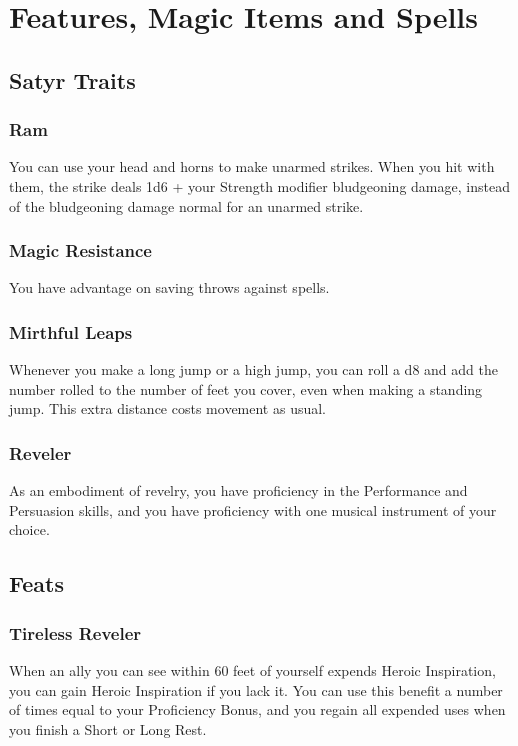 \documentclass[letterpaper,openany,oneside,twocolumn]{book}
\begin{document}
\onecolumn


\rendercharactersheet

\renderbackgroundsheet

\renderspellsheet


\restoregeometry
\twocolumn

\chapter*{Features, Magic Items and Spells}

\section*{Satyr Traits}
\subsection*{Ram}
You can use your head and horns to make unarmed strikes. When you hit with them, the strike deals 1d6 + your Strength modifier bludgeoning damage, instead of the bludgeoning damage normal for an unarmed strike.
\subsection*{Magic Resistance}
You have advantage on saving throws against spells.
\subsection*{Mirthful Leaps}
Whenever you make a long jump or a high jump, you can roll a d8 and add the number rolled to the number of feet you cover, even when making a standing jump. This extra distance costs movement as usual.
\subsection*{Reveler}
As an embodiment of revelry, you have proficiency in the Performance and Persuasion skills, and you have proficiency with one musical instrument of your choice.

\section*{Feats}
\subsection*{Tireless Reveler}
When an ally you can see within 60 feet of yourself expends Heroic Inspiration, you can gain Heroic Inspiration if you lack it. You can use this benefit a number of times equal to your Proficiency Bonus, and you regain all expended uses when you finish a Short or Long Rest.
\end{document}

